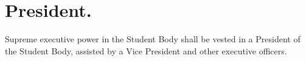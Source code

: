 
\section{President.}

Supreme executive power in the Student Body shall be vested in a President of the Student Body, assisted by a Vice President and other executive officers.

